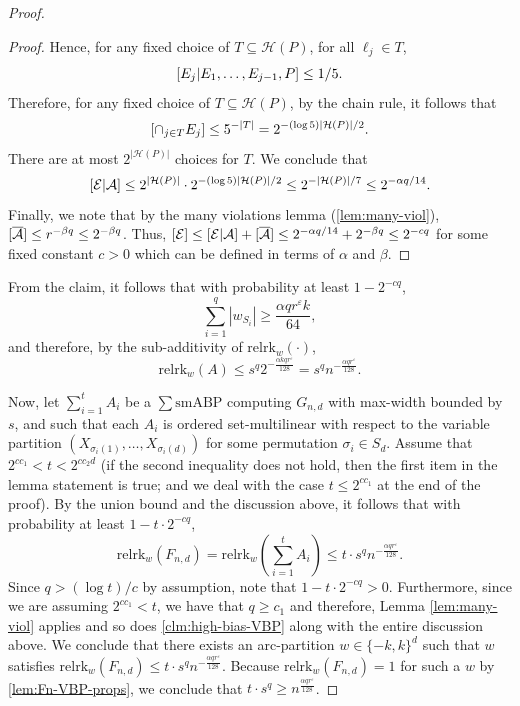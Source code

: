 \documentclass[10pt,a4paper]{article}
\theoremstyle{definition}%
\theoremstyle{plain}
\let\Pr\relax
\DeclareMathOperator*{\Pr}{\mathbb{P}}
\newcommand{\sbp}{\sum\mathrm{smABP}}
\newcommand{\rk}{\mathrm{relrk}}
\newcommand{\eps}{\varepsilon}
\newcommand{\calA}{\mathcal{A}}
\newcommand{\calE}{\mathcal{E}}
\newcommand{\calH}{\mathcal{H}}
\begin{document}
\begin{proof}
\begin{proof}
Hence, for any fixed choice of $T\subseteq \calH(P)$, for all $\ell_j \in T$,
\[
\Pr[E_j|E_1,\ldots,E_{j-1},P] \leq 1/5.
\]
Therefore, for any fixed choice of $T\subseteq \calH(P)$, by the chain rule, it follows that 
\[
\Pr[\cap_{j\in T}E_j]\leq 5^{-|T|} = 2^{-(\log 5)|\calH(P)|/2}.
\]
There are at most $2^{|\calH(P)|}$ choices for $T$. We conclude that 
\[\Pr[\calE|\calA]\leq 2^{|\calH(P)|} \cdot 2^{-(\log 5)|\calH(P)|/2}\leq 2^{-|\calH(P)|/7}\leq 2^{-\alpha q/14}.
\]
Finally, we note that by the many violations lemma (\autoref{lem:many-viol}), $\Pr[\overline{\calA}]\leq r^{-\beta q}\leq 2^{-\beta q}$. Thus, $\Pr[\calE] \leq \Pr[\calE|\calA] + \Pr[\overline{\calA}] \leq 2^{-\alpha q/14} + 2^{-\beta q} \leq 2^{-cq}$ for some fixed constant $c>0$ which can be defined in terms of $\alpha$ and $\beta$.
\end{proof}

From the claim, it follows that with probability at least $1 - 2^{-cq}$, 
\[
\sum_{i=1}^q |w_{S_i}| \geq \frac{\alpha qr^\eps k}{64},
\]
and therefore, by the sub-additivity of $\rk_w(\cdot)$,
\[
\rk_w(A) \leq s^q 2^{-\frac{\alpha kqr^\eps }{128}} = s^q n^{-{\frac{\alpha qr^\eps }{128}}}.
\]

Now, let $\sum_{i=1}^t A_i$ be a $\sbp$ computing $G_{n,d}$ with max-width bounded by $s$, and such that each $A_i$ is ordered set-multilinear with respect to the variable partition $(X_{\sigma_i(1)},\ldots, X_{\sigma_i(d)})$ for some permutation $\sigma_i\in S_d$. Assume that $2^{cc_1}< t< 2^{cc_2d}$ (if the second inequality does not hold, then the first item in the lemma statement is true; and we deal with the case $t\leq 2^{cc_1}$ at the end of the proof). %
By the union bound and the discussion above, it follows that with probability at least $1-t\cdot 2^{-cq}$, 
\[
\rk_w(F_{n,d}) = \rk_w\left(\sum_{i=1}^t A_i\right) \leq t\cdot s^q n^{-{\frac{\alpha qr^\eps }{128}}}.
\]
Since $q> (\log t)/c$ by assumption, note that $1-t\cdot 2^{-cq}>0$. Furthermore, since we are assuming $2^{cc_1}< t$, we have that $q\geq c_1$ and therefore, Lemma \ref{lem:many-viol} applies and so does \autoref{clm:high-bias-VBP} along with the entire discussion above. We conclude that there exists an arc-partition $w\in \{-k,k\}^d$ such that $w$ satisfies $
\rk_w(F_{n,d})\leq t\cdot s^q n^{-{\frac{\alpha qr^\eps }{128}}}$. Because $\rk_w(F_{n,d}) = 1$ for such a $w$ by \autoref{lem:Fn-VBP-props}, we conclude that $t\cdot s^q \geq n^{{\frac{\alpha qr^\eps }{128}}}$.


\end{proof}
\end{document}
